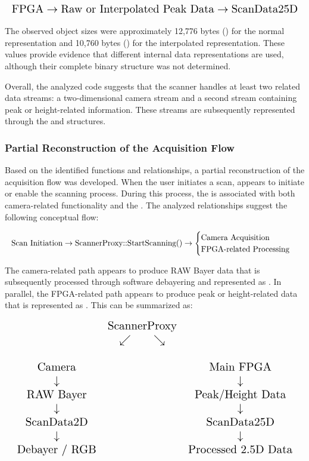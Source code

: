 \[
\resizebox{\columnwidth}{!}{$
\text{FPGA}
\rightarrow
\text{Raw or Interpolated Peak Data}
\rightarrow
\text{ScanData25D}
$}
\]

The observed object sizes were approximately 12,776 bytes () for the normal representation and 10,760 bytes () for the interpolated representation. These values provide evidence that different internal data representations are used, although their complete binary structure was not determined.

Overall, the analyzed code suggests that the scanner handles at least two related data streams: a two-dimensional camera stream and a second stream containing peak or height-related information. These streams are subsequently represented through the  and  structures.

\subsubsection{Partial Reconstruction of the Acquisition Flow}

Based on the identified functions and relationships, a partial reconstruction of the acquisition flow was developed. When the user initiates a scan,  appears to initiate or enable the scanning process. During this process, the  is associated with both camera-related functionality and the . The analyzed relationships suggest the following conceptual flow:

\[
\resizebox{\columnwidth}{!}{$
\text{Scan Initiation}
\rightarrow
\text{ScannerProxy::StartScanning()}
\rightarrow
\begin{cases}
\text{Camera Acquisition}\\
\text{FPGA-related Processing}
\end{cases}
$}
\]

The camera-related path appears to produce RAW Bayer data that is subsequently processed through software debayering and represented as . In parallel, the FPGA-related path appears to produce peak or height-related data that is represented as . This can be summarized as:

\[
\resizebox{\columnwidth}{!}{$
\begin{array}{ccc}
& \text{ScannerProxy} & \\
& \swarrow \qquad \searrow & \\\\
\text{Camera} && \text{Main FPGA} \\
\downarrow && \downarrow \\
\text{RAW Bayer} && \text{Peak/Height Data} \\
\downarrow && \downarrow \\
\text{ScanData2D} && \text{ScanData25D} \\
\downarrow && \downarrow \\
\text{Debayer / RGB} && \text{Processed 2.5D Data}
\end{array}
$}
\]

